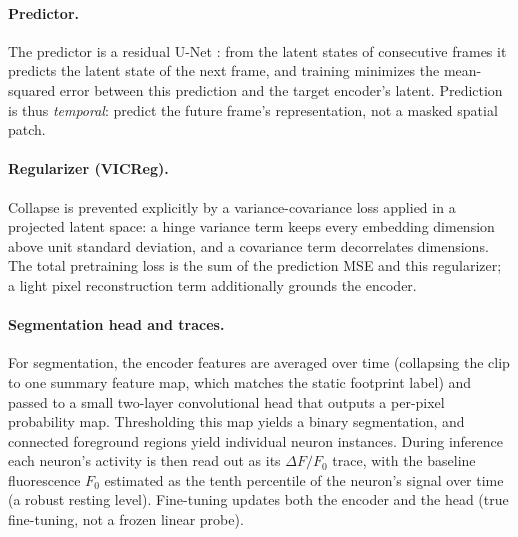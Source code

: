 \documentclass[twoside,11pt]{article}
\begin{document}
\paragraph{Predictor.} The predictor is a residual U-Net \citep{ronneberger2015unet}: from the
latent states of consecutive frames it predicts the latent state of the next frame, and training
minimizes the mean-squared error between this prediction and the target encoder's latent. Prediction
is thus \emph{temporal}: predict the future frame's representation, not a masked spatial patch.

\paragraph{Regularizer (VICReg).} Collapse is prevented explicitly by a variance-covariance loss
\citep{bardes2022vicreg} applied in a projected latent space: a hinge variance term keeps every
embedding dimension above unit standard deviation, and a covariance term decorrelates dimensions.
The total pretraining loss is the sum of the prediction MSE and this regularizer; a light pixel
reconstruction term additionally grounds the encoder.

\paragraph{Segmentation head and traces.} For segmentation, the encoder features are averaged over
time (collapsing the clip to one summary feature map, which matches the static footprint label) and
passed to a small two-layer convolutional head that outputs a per-pixel probability map. Thresholding
this map yields a binary segmentation, and connected foreground regions yield individual neuron
instances. During inference each neuron's activity is then read out as its $\Delta F / F_0$ trace,
with the baseline fluorescence $F_0$ estimated as the tenth percentile of the neuron's signal over
time (a robust resting level). Fine-tuning updates both the encoder and the head (true fine-tuning,
not a frozen linear probe).
\end{document}
